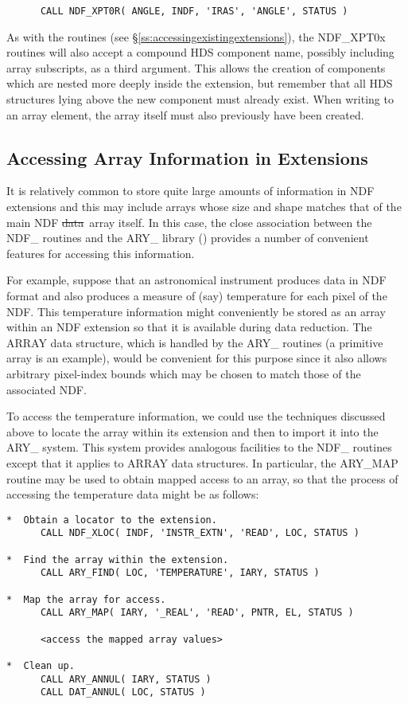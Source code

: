 \small
\begin{verbatim}
      CALL NDF_XPT0R( ANGLE, INDF, 'IRAS', 'ANGLE', STATUS )
\end{verbatim}
\normalsize

As with the  routines (see
\S\ref{ss:accessingexistingextensions}), the NDF\_XPT0x routines will
also accept a compound HDS component name, possibly including array
subscripts, as a third argument. This allows the creation of
components which are nested more deeply inside the extension, but
remember that all HDS structures lying above the new component must
already exist.  When writing to an array element, the array itself
must also previously have been created.

\subsection{\label{ss:extnarrays}Accessing Array Information in Extensions}

It is relatively common to store quite large amounts of information in NDF
extensions and this may include arrays whose size and shape matches that of the
main NDF \st{data}\ array itself. In this case, the close association between
the NDF\_ routines and the ARY\_ library ()
provides a number of convenient features for accessing this
information.

For example, suppose that an astronomical instrument produces data in
NDF format and also produces a measure of (say) temperature for each
pixel of the NDF. This temperature information might conveniently be
stored as an array within an NDF extension so that it is available
during data reduction. The ARRAY data structure, which is handled by
the ARY\_ routines (a primitive  array is an
example), would be convenient for this purpose since it also allows
arbitrary pixel-index bounds which may be chosen to match those of the
associated NDF.

To access the temperature information, we could use the techniques discussed
above to locate the array within its extension and then to import it into the
ARY\_ system. This system provides analogous facilities to the NDF\_ routines
except that it applies to ARRAY data structures. In particular, the ARY\_MAP
routine may be used to obtain mapped access to an array, so that the process of
accessing the temperature data might be as follows:

\small
\begin{verbatim}
*  Obtain a locator to the extension.
      CALL NDF_XLOC( INDF, 'INSTR_EXTN', 'READ', LOC, STATUS )

*  Find the array within the extension.
      CALL ARY_FIND( LOC, 'TEMPERATURE', IARY, STATUS )

*  Map the array for access.
      CALL ARY_MAP( IARY, '_REAL', 'READ', PNTR, EL, STATUS )

      <access the mapped array values>

*  Clean up.
      CALL ARY_ANNUL( IARY, STATUS )
      CALL DAT_ANNUL( LOC, STATUS )
\end{verbatim}
\normalsize

